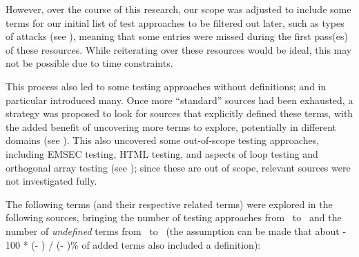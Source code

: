However, over the course of this research, our scope was adjusted to include
some terms for our initial list of test approaches to be filtered out later,
such as types of attacks (see ), meaning that some entries
were missed during the first pass(es) of these resources. While reiterating
over these resources would be ideal, this may not be possible due to time
constraints.


\newcount\TotalBefore
\newcount\TotalAfter
\newcount\UndefBefore
\newcount\UndefAfter



This process also led to some testing approaches without definitions;
\citep{IEEE2022} and \citep{Firesmith2015} in particular introduced many.
Once more ``standard'' sources had been exhausted, a strategy was proposed to
look for sources that explicitly defined these terms, with the added benefit of
uncovering more terms to explore, potentially in different domains (see
). This also uncovered some out-of-scope testing approaches,
including EMSEC testing, HTML testing, and aspects of loop testing and
orthogonal array testing (see ); since these
are out of scope, relevant sources were not investigated fully.

The following terms (and their respective related terms)
were explored in the following sources, bringing the number of testing
approaches from \the\TotalBefore~to \the\TotalAfter~and the number of
\emph{undefined} terms from \the\UndefBefore~to \the\UndefAfter~(the assumption
can be made that about \the{} - 100 * (\UndefAfter - \UndefBefore) /
(\TotalAfter - \TotalBefore)\relax\% of added terms also included a definition):


